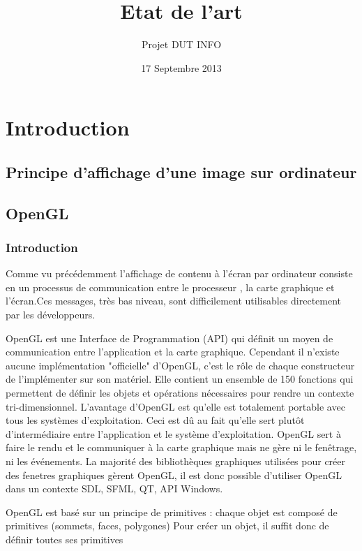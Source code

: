 \documentclass{report}
\title{Etat de l'art}
\author{Projet DUT INFO}
\date{17 Septembre 2013}
\begin{document}
\maketitle
\tableofcontents

\part{Introduction}

\chapter{Principe d'affichage d'une image sur ordinateur}
	



\chapter{OpenGL}

\section{Introduction}
Comme vu précédemment l'affichage de contenu à l'écran par ordinateur consiste en un processus de communication entre le processeur , la carte graphique et l'écran.Ces messages, très bas niveau, sont difficilement utilisables directement par les développeurs.

OpenGL est une Interface de Programmation (API) qui définit un moyen de communication entre l'application et la carte graphique.
Cependant il n'existe aucune implémentation "officielle" d'OpenGL, c'est le rôle de chaque constructeur de l'implémenter sur son matériel.  
Elle contient un ensemble de 150 fonctions qui permettent de définir les objets et opérations nécessaires pour rendre un contexte tri-dimensionnel.
L’avantage d'OpenGL est qu’elle est totalement portable avec tous les systèmes d'exploitation. Ceci est dû au fait qu'elle sert plutôt d'intermédiaire entre l'application et le système d'exploitation. OpenGL sert à faire le rendu et le communiquer à la carte graphique mais ne gère ni le fenêtrage, ni les événements. 
La majorité des bibliothèques graphiques utilisées pour créer des fenetres graphiques gèrent OpenGL, il est donc possible d'utiliser OpenGL dans un contexte SDL, SFML, QT, API Windows.


OpenGL est basé sur un principe de primitives : chaque objet est composé de primitives (sommets, faces, polygones) Pour créer un objet, il suffit donc de définir toutes ses primitives
\end{document}
